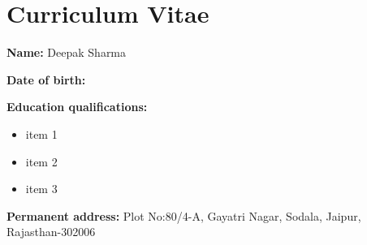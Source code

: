 \chapter*{Curriculum Vitae}

{\bf Name:} Deepak Sharma 
\vspace{0.25cm}

\noindent
{\bf Date of birth:} 
\vspace{0.25cm}

\noindent
{\bf Education qualifications:}

\begin{itemize}
\item{ item 1
}

\item{ item 2
}

\item{ item 3
}

\end{itemize}

\noindent 
{\bf Permanent address:} Plot No:80/4-A, Gayatri Nagar, 
Sodala, Jaipur, Rajasthan-302006


